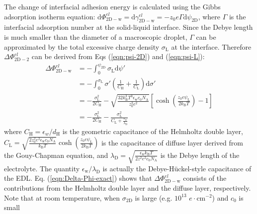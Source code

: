 \documentclass[aps,prl,reprint,groupedaddress,amsmath,amssymb, showpacs]{revtex4-1}
\begin{document}
The change of interfacial adhesion energy is calculated using the
Gibbs adsorption isotherm equation:
\(\mathrm{d}\Phi_{\mathrm{2D-w}}^{el} = \mathrm{d}
\gamma_{\mathrm{2D-w}}^{el} = -z_{0}e\Gamma
\mathrm{d}\psi_{\mathrm{2D}}\), where \(\Gamma\) is the interfacial
adsorption number at the solid-liquid interface. Since the Debye
length is much smaller than the diameter of a macroscopic droplet,
\(\Gamma\) can be approximated by the total excessive charge density
\(\sigma_{\mathrm{L}}\) at the interface. Therefore \(\Delta
\Phi_{\mathrm{2D-2}}^{el}\) can be derived from Eqs (\ref{eqn:psi-2D})
and (\ref{eqn:psi-L}):
\begin{equation}
\label{eqn:Delta-Phi-exact}
\begin{aligned}
\Delta \Phi_{\mathrm{2D-w}}^{el}
&= -\int_{0}^{\psi_{\mathrm{2D}}} \sigma_{\mathrm{L}} \mathrm{d}\psi' \\
&= -\int_{0}^{\sigma_{\mathrm{L}}} \sigma'\left(
   \frac{1}{C_{\mathrm{H}}} + \frac{1}{C_{\mathrm{L}}}
                                          \right) \mathrm{d}\sigma' \\
&= -\frac{\sigma_{\mathrm{L}}^{2}}{2C_{\mathrm{H}}}
    -\sqrt{\frac{32k_{\mathrm{B}}^{3}T^{3} \epsilon_{\mathrm{w}} c_{0} N_{\mathrm{A}}}{z_{0}^{2}e^{2}}}
   \left[\cosh(\frac{z_{0}e\psi_{\mathrm{L}}}{2k_{\mathrm{B}}T}) - 1\right] \\
&= -\frac{\sigma_{\mathrm{L}}^{2}}{2C_{\mathrm{H}}} 
   - \frac{\sigma_{\mathrm{L}}^{2}}{C_{\mathrm{L}} 
   + \frac{\epsilon_{w}}{\lambda_{\mathrm{D}}}}
\end{aligned}
\end{equation}
where \(C_{\mathrm{H}}=\epsilon_{w}/d_{\mathrm{H}}\) is the geometric
capacitance of the Helmholtz double layer,
\(C_{\mathrm{L}}=\sqrt{\frac{2z_{0}^{2}e^{2}\epsilon_{\mathrm{w}}c_{0}N_{\mathrm{A}}}{k_{\mathrm{B}}T}}
\cosh (\frac{z_{0}e\psi_{\mathrm{L}}}{2k_{\mathrm{B}}T})\) is the
capacitance of diffuse layer derived from the Gouy-Chapman equation,
and
\(\lambda_{\mathrm{D}}=\sqrt{\frac{\epsilon_{\mathrm{w}}k_{\mathrm{B}}T}{2z^{2}e^{2}c_{0}N_{\mathrm{A}}}}\)
is the Debye length of the electrolyte. The quantity
\(\epsilon_{\mathrm{w}}/\lambda_{\mathrm{D}}\) is actually the
Debye-Hückel-style capacitance of the EDL.
Eq. (\ref{eqn:Delta-Phi-exact}) shows that \(\Delta
\Phi_{\mathrm{2D-w}}^{el}\) consists of the contributions from the
Helmholtz double layer and the diffuse layer, respectively.  Note that
at room temperature, when \(\sigma_{\mathrm{2D}}\) is large
(e.g. \(10^{13}\) \(e\cdot \mathrm{cm}^{-2}\)) and \(c_{0}\) is small
\end{document}
